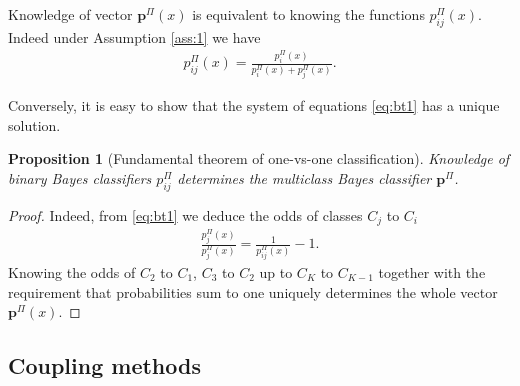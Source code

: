 \documentclass[twoside,11pt]{article}
\newtheorem{prop}{Proposition}
\begin{document}
Knowledge of vector $\boldsymbol{p}^\Pi(x)$ is equivalent to knowing the functions $p^\Pi_{ij}(x)$. Indeed under Assumption \ref{ass:1} we have
\begin{align}
p_{ij}^\Pi(x) = \frac{p_i^\Pi(x)}{p_i^\Pi(x) + p_j^\Pi(x)}. \label{eq:bt1}
\end{align}

Conversely, it is easy to show that  the system of equations \eqref{eq:bt1} has a unique solution.

\begin{prop}[Fundamental theorem of one-vs-one classification]
	 \label{prop:binary2multi}
	 Knowledge of binary Bayes classifiers $p_{ij}^\Pi$ determines the multiclass Bayes classifier $\boldsymbol{p}^\Pi$.
\end{prop}
\begin{proof}
	Indeed, from \eqref{eq:bt1} we deduce the odds of classes $C_j$ to $C_i$
	\begin{align}
	\frac{p_j^\Pi(x)}{p_j^\Pi(x)} = \frac{1}{p^\Pi_{ij}(x)}- 1.
	\end{align}
	Knowing the odds of $C_2$ to $C_1$, $C_3$ to $C_2$ up to $C_{K}$ to $C_{K-1}$ together with the requirement that probabilities sum to one uniquely determines the whole vector $\boldsymbol{p}^\Pi(x)$.
\end{proof}


\subsection{Coupling methods}
\end{document}
